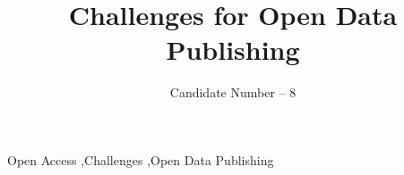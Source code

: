 \documentclass[12pt]{elsarticle}
\begin{document}
\begin{frontmatter}



\title{Challenges for Open Data Publishing
}


\author{Candidate Number -- 8}
\address{UiT -- The Arctic University of Norway}

% 

\begin{keyword}
Open Access \sep Challenges \sep Open Data Publishing 


\end{keyword}
\end{frontmatter}
\end{document}
